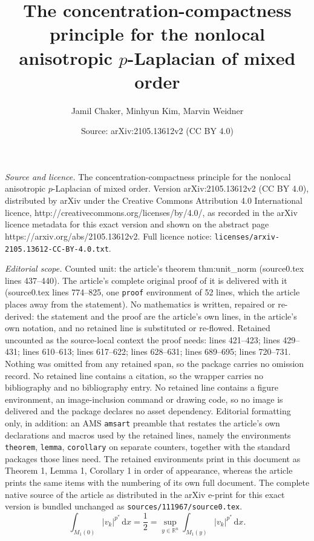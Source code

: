 \documentclass[10pt,a4paper]{amsart}
\title{The concentration-compactness principle for the nonlocal anisotropic $p$-Laplacian of mixed order}
\author{Jamil Chaker, Minhyun Kim, Marvin Weidner}
\date{Source: arXiv:2105.13612v2 (CC BY 4.0)}
\begin{document}
\maketitle

\noindent\emph{Source and licence.} The concentration-compactness principle for the nonlocal anisotropic $p$-Laplacian of mixed order. Version arXiv:2105.13612v2 (CC BY 4.0), distributed by arXiv under the Creative Commons Attribution 4.0 International licence, http://creativecommons.org/licenses/by/4.0/, as recorded in the arXiv licence metadata for this exact version and shown on the abstract page https://arxiv.org/abs/2105.13612v2. Full licence notice: \texttt{licenses/arxiv-2105.13612-CC-BY-4.0.txt}.\par\smallskip

\noindent\textit{Editorial scope.} Counted unit: the article's theorem thm:unit\_norm (source0.tex lines 437--440). The article's complete original proof of it is delivered with it (source0.tex lines 774--825, one \texttt{proof} environment of 52 lines, which the article places away from the statement). No mathematics is written, repaired or re-derived: the statement and the proof are the article's own lines, in the article's own notation, and no retained line is substituted or re-flowed.  Retained uncounted as the source-local context the proof needs: lines 421--423; lines 429--431; lines 610--613; lines 617--622; lines 628--631; lines 689--695; lines 720--731.  Nothing was omitted from any retained span, so the package carries no omission record.  No retained line contains a citation, so the wrapper carries no bibliography and no bibliography entry.  No retained line contains a figure environment, an image-inclusion command or drawing code, so no image is delivered and the package declares no asset dependency.  Editorial formatting only, in addition: an AMS \texttt{amsart} preamble that restates the article's own declarations and macros used by the retained lines, namely the environments \texttt{theorem}, \texttt{lemma}, \texttt{corollary} on separate counters, together with the standard packages those lines need.  The retained environments print in this document as Theorem 1, Lemma 1, Corollary 1 in order of appearance, whereas the article prints the same items with the numbering of its own full document.  The complete native source of the article as distributed in the arXiv e-print for this exact version is bundled unchanged as \texttt{sources/111967/source0.tex}.
\begin{equation} \label{eq:sup}
\int_{M_1(0)} |v_k|^{p^{\ast}} \,\mathrm{d}x = \frac{1}{2} = \sup_{y \in \mathbb{R}^n} \int_{M_1(y)} |v_k|^{p^{\ast}} \,\mathrm{d}x.
\end{equation}
\end{document}
